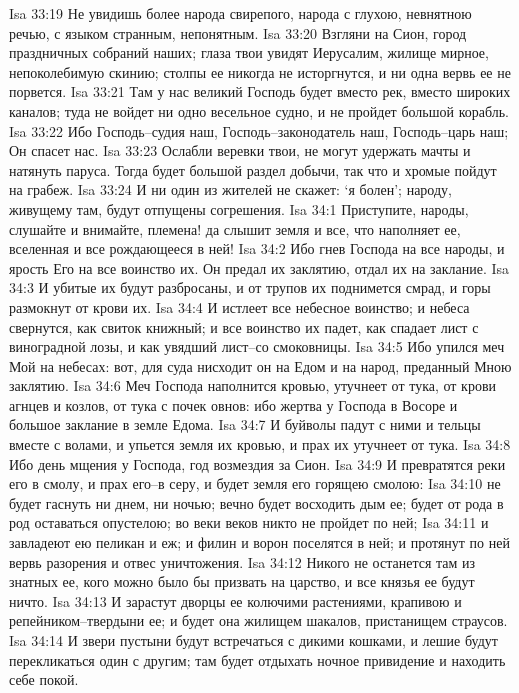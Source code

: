 Isa 33:19  Не увидишь более народа свирепого, народа с глухою, невнятною речью, с языком странным, непонятным.
Isa 33:20  Взгляни на Сион, город праздничных собраний наших; глаза твои увидят Иерусалим, жилище мирное, непоколебимую скинию; столпы ее никогда не исторгнутся, и ни одна вервь ее не порвется.
Isa 33:21  Там у нас великий Господь будет вместо рек, вместо широких каналов; туда не войдет ни одно весельное судно, и не пройдет большой корабль.
Isa 33:22  Ибо Господь--судия наш, Господь--законодатель наш, Господь--царь наш; Он спасет нас.
Isa 33:23  Ослабли веревки твои, не могут удержать мачты и натянуть паруса. Тогда будет большой раздел добычи, так что и хромые пойдут на грабеж.
Isa 33:24  И ни один из жителей не скажет: `я болен'; народу, живущему там, будут отпущены согрешения.
Isa 34:1  Приступите, народы, слушайте и внимайте, племена! да слышит земля и все, что наполняет ее, вселенная и все рождающееся в ней!
Isa 34:2  Ибо гнев Господа на все народы, и ярость Его на все воинство их. Он предал их заклятию, отдал их на заклание.
Isa 34:3  И убитые их будут разбросаны, и от трупов их поднимется смрад, и горы размокнут от крови их.
Isa 34:4  И истлеет все небесное воинство; и небеса свернутся, как свиток книжный; и все воинство их падет, как спадает лист с виноградной лозы, и как увядший лист--со смоковницы.
Isa 34:5  Ибо упился меч Мой на небесах: вот, для суда нисходит он на Едом и на народ, преданный Мною заклятию.
Isa 34:6  Меч Господа наполнится кровью, утучнеет от тука, от крови агнцев и козлов, от тука с почек овнов: ибо жертва у Господа в Восоре и большое заклание в земле Едома.
Isa 34:7  И буйволы падут с ними и тельцы вместе с волами, и упьется земля их кровью, и прах их утучнеет от тука.
Isa 34:8  Ибо день мщения у Господа, год возмездия за Сион.
Isa 34:9  И превратятся реки его в смолу, и прах его--в серу, и будет земля его горящею смолою:
Isa 34:10  не будет гаснуть ни днем, ни ночью; вечно будет восходить дым ее; будет от рода в род оставаться опустелою; во веки веков никто не пройдет по ней;
Isa 34:11  и завладеют ею пеликан и еж; и филин и ворон поселятся в ней; и протянут по ней вервь разорения и отвес уничтожения.
Isa 34:12  Никого не останется там из знатных ее, кого можно было бы призвать на царство, и все князья ее будут ничто.
Isa 34:13  И зарастут дворцы ее колючими растениями, крапивою и репейником--твердыни ее; и будет она жилищем шакалов, пристанищем страусов.
Isa 34:14  И звери пустыни будут встречаться с дикими кошками, и лешие будут перекликаться один с другим; там будет отдыхать ночное привидение и находить себе покой.
